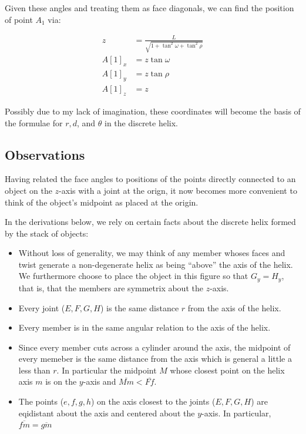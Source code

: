 \documentclass[11pt]{article}
\begin{document}
Given these angles and treating them as face diagonals,
we can find the position of point $A_1$ via:

\begin{align}
  z &= \frac{L}{\sqrt{1 + \tan^2{\omega} + \tan^2{\rho}}}  \\
  A[1]_x &= z \tan{\omega} \\
  A[1]_y &= z \tan{\rho} \\
  A[1]_z &= z
\end{align}

Possibly due to my lack of imagination, these coordinates
will become the basis of the formulae for $r,d$, and $\theta$
in the discrete helix.



\subsection{Observations}

Having related the face angles to positions of the points directly connected
to an object on the $z$-axis with a joint at the orign, it now becomes more
convenient to think of the object's midpoint as placed at the origin.

In the derivations below, we rely on certain facts about
the discrete helix formed by the stack of objects:
\begin{itemize}
\item Without loss of generality, we may think of any member whoses faces
  and twist generate a non-degenerate helix as being ``above'' the
  axis of the helix. We furthermore choose to place the object in
  this figure so that $G_y = H_y$, that is, that the members are symmetrix
  about the $z$-axis. 
  
\item Every joint ($E,F,G,H$) is the same distance $r$ from the axis of the helix.
\item Every member is in the same angular relation to the axis of the helix.
\item Since every member cuts across a cylinder around the axis,
  the midpoint of every memeber is the same distance from the axis
  which is general a little a less than $r$. In particular the midpoint $M$
  whose closest point on the helix axis $m$ is on the $y$-axis and
  $\overline{Mm} < \overline{Ff}$.
\item The points ($e,f,g,h$) on the axis closest to the joints ($E,F,G,H$)
  are eqidistant about the axis and centered about the $y$-axis. In
  particular, $\overline{fm} = \overline{gm}$
\end{itemize}
\end{document}
